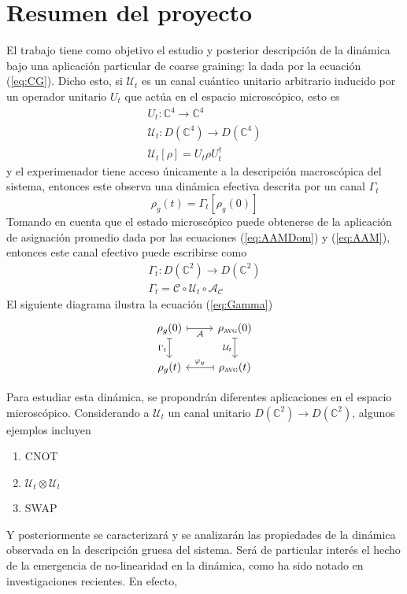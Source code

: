 \documentclass[onecolumn,11pt]{article}
\newcommand{\mcU}{\mathcal{U}}
\newcommand{\mcC}{\mathcal{C}}
\newcommand{\mcA}{\mathcal{A}}
\newcommand{\Complex}{\mathbb{C}} %
\begin{document}
\section{Resumen del proyecto}

El trabajo tiene como objetivo el estudio y posterior descripción de la dinámica bajo una aplicación particular de coarse graining: la dada por la ecuación (\ref{eq:CG}). Dicho esto, si $\mcU_{t}$ es un canal cuántico unitario arbitrario inducido por un operador unitario $U_{t}$ que actúa en el espacio microscópico, esto es
\begin{gather}
U_{t}:\Complex^{4} \rightarrow \Complex^{4} \label{eq:UnitOpDyn}\\
\mcU_{t}:D(\Complex^{4})\rightarrow D(\Complex^{4}) \label{eq:UnitChaDyn}\\
\mcU_{t}[\rho]=U_{t}\rho U_{t}^{\dag}
\end{gather}
y el experimenador tiene acceso únicamente a la descripción macroscópica del sistema, entonces este observa una dinámica efectiva descrita por un canal $\Gamma_{t}$
\begin{equation}
\rho_{g}(t)=\Gamma_{t}[\rho_{g}(0)]
\end{equation}
Tomando en cuenta que el estado microscópico puede obtenerse de la aplicación de asignación promedio dada por las ecuaciones (\ref{eq:AAMDom}) y (\ref{eq:AAM}), entonces este canal efectivo puede escribirse como
\begin{gather}
\Gamma_{t}:D(\Complex^{2})\rightarrow D(\Complex^{2})\label{eq:GammaDom}\\
\Gamma_{t}=\mcC\circ\mcU_{t}\circ\mcA_{\mcC}\label{eq:Gamma}
\end{gather}
El siguiente diagrama ilustra la ecuación (\ref{eq:Gamma})
\[\begin{tikzcd}[arrows={<-|}]
\rho_{g}(0)  & \rho_{\textsc{avg}}(0) \arrow{l}{\mcA} \\
\rho_{g}(t) \arrow{u}{\Gamma_{t}} \arrow{r}{\varphi_y} & \rho_{\textsc{avg}}(t) \arrow{u}{\mcU_{t}}
\end{tikzcd}
\]

Para estudiar esta dinámica, se propondrán diferentes aplicaciones en el espacio microscópico. Considerando a $\mcU_{t}$ un canal unitario $D(\Complex^{2})\rightarrow D(\Complex^{2})$, algunos ejemplos incluyen
    \begin{multicols}{3}
    \begin{enumerate}
        \item \textsc{CNOT}
        \item $\mcU_{t}\otimes \mcU_{t}$
        \item \textsc{SWAP}
    \end{enumerate}
    \end{multicols}
Y posteriormente se caracterizará y se analizarán las propiedades de la dinámica observada en la descripción gruesa del sistema. Será de particular interés el hecho de la emergencia de no-linearidad en la dinámica, como ha sido notado en investigaciones recientes\cite{Macro-To-Micro}\cite{CGEmergingDynamics}. En efecto,
\end{document}
